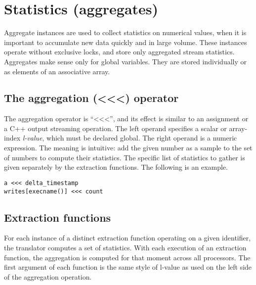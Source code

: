 \documentclass[twoside,english]{article}
\newenvironment{vindent}
{\begin{list}{}{\setlength{\listparindent}{6pt}}
\item[]}
{\end{list}}
\begin{document}
\section{Statistics (aggregates)\label{sec:Statistics}}
Aggregate instances are used to collect statistics on numerical values, when
it is important to accumulate new data quickly and in large volume. These
instances operate without exclusive locks, and store only aggregated stream
statistics. Aggregates make sense only for global variables. They are stored
individually or as elements of an associative array.

\subsection{The aggregation (\textless\hspace{1 sp}\textless\hspace{1 sp}\textless) operator}
\index{\textless\hspace{1 sp}\textless\hspace{1 sp}\textless}
The aggregation operator is {}``\textless\hspace{1 sp}\textless\hspace{1 sp}\textless'',
and its effect is similar to an assignment or a C++ output streaming operation.
The left operand specifies a scalar or array-index \emph{l-value}, which
must be declared global. The right operand is a numeric expression. The meaning
is intuitive: add the given number as a sample to the set of numbers to compute their
statistics. The specific list of statistics to gather is given separately
by the extraction functions. The following is an example.

\begin{vindent}
\begin{verbatim}
a <<< delta_timestamp
writes[execname()] <<< count
\end{verbatim}
\end{vindent}

\subsection{Extraction functions}
For each instance of a distinct extraction function operating on a given
identifier, the translator computes a set of statistics. With each execution
of an extraction function, the aggregation is computed for that moment across
all processors. The first argument of each function is the same style of
l-value as used on the left side of the aggregation operation.
\end{document}
